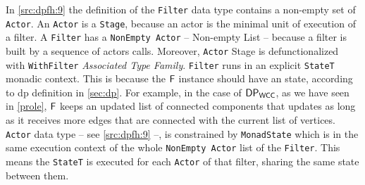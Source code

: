 In \autoref{src:dpfh:9} the definition of the \texttt{Filter} data type contains a non-empty set of \texttt{Actor}.
An \texttt{Actor} is a \texttt{Stage}, because an actor is the minimal unit of execution of a filter. 
A \texttt{Filter} has a \texttt{NonEmpty Actor} -- Non-empty List -- because a filter is built by a sequence of actors calls. 
Moreover, \texttt{Actor} Stage is defunctionalized with \texttt{WithFilter} \emph{Associated Type Family}. 
\texttt{Filter} runs in an explicit \texttt{StateT} monadic context. This is because the $\mathsf{F}$ instance should have an state, according to \acrshort{dp} definition in \autoref{sec:dp}.
For example, in the case of $\mathsf{DP_{WCC}}$, as we have seen in \autoref{prole}, $\mathsf{F}$ keeps an updated list of connected components that updates as long as it receives more edges that are connected with the current list of vertices.
\texttt{Actor} data type -- see \autoref{src:dpfh:9} --, is constrained by \texttt{MonadState} which is in the same execution context of the whole \texttt{NonEmpty Actor} list of the \texttt{Filter}. 
This means the \texttt{StateT} is executed for each \texttt{Actor} of that filter, sharing the same state between them. 

